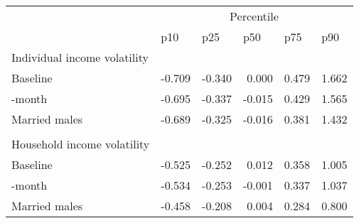 \begin{tabular}{lrrrrr}
\toprule
      & \multicolumn{5}{c}{Percentile} \\
\cmidrule{2-6}      & \multicolumn{1}{l}{p10} & \multicolumn{1}{l}{p25} & \multicolumn{1}{l}{p50} & \multicolumn{1}{l}{p75} & \multicolumn{1}{l}{p90} \\
\midrule
Individual income volatility &       &       &       &       &  \\
\quad Baseline & -0.709 & -0.340 & 0.000 & 0.479 & 1.662 \\
\quad 24-month & -0.695 & -0.337 & -0.015 & 0.429 & 1.565 \\
\quad Married males & -0.689 & -0.325 & -0.016 & 0.381 & 1.432 \\
      &       &       &       &       &  \\
Household income volatility &       &       &       &       &  \\
\quad Baseline & -0.525 & -0.252 & 0.012 & 0.358 & 1.005 \\
\quad 24-month & -0.534 & -0.253 & -0.001 & 0.337 & 1.037 \\
\quad Married males & -0.458 & -0.208 & 0.004 & 0.284 & 0.800 \\
\bottomrule
\end{tabular}%
